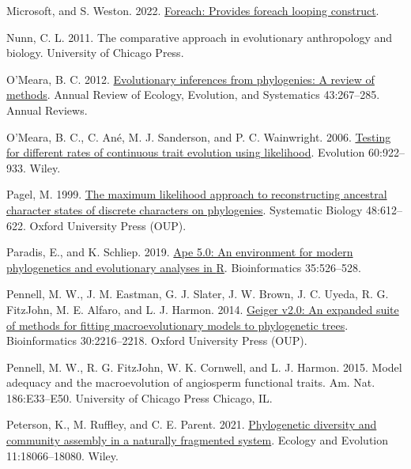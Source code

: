 \documentclass[fleqn,10pt,lineno]{wlpeerj} %
\newlength{\cslhangindent}
\newenvironment{CSLReferences}[2] %
 {\begin{list}{}{%
  \setlength{\itemindent}{0pt}
  \setlength{\leftmargin}{0pt}
  \setlength{\parsep}{0pt}
  \ifodd #1
   \setlength{\leftmargin}{\cslhangindent}
   \setlength{\itemindent}{-1\cslhangindent}
  \fi
  \setlength{\itemsep}{#2\baselineskip}}}
 {\end{list}}
\begin{document}
\begin{CSLReferences}{1}{0}
Microsoft, and S. Weston. 2022. \href{https://CRAN.R-project.org/package=foreach}{Foreach: Provides foreach looping construct}.

Nunn, C. L. 2011. The comparative approach in evolutionary anthropology and biology. University of Chicago Press.

O'Meara, B. C. 2012. \href{https://doi.org/10.1146/annurev-ecolsys-110411-160331}{Evolutionary inferences from phylogenies: A review of methods}. Annual Review of Ecology, Evolution, and Systematics 43:267--285. Annual Reviews.

O'Meara, B. C., C. Ané, M. J. Sanderson, and P. C. Wainwright. 2006. \href{https://doi.org/10.1111/j.0014-3820.2006.tb01171.x}{Testing for different rates of continuous trait evolution using likelihood}. Evolution 60:922--933. Wiley.

Pagel, M. 1999. \href{https://doi.org/10.1080/106351599260184}{The maximum likelihood approach to reconstructing ancestral character states of discrete characters on phylogenies}. Systematic Biology 48:612--622. Oxford University Press (OUP).

Paradis, E., and K. Schliep. 2019. \href{https://doi.org/10.1093/bioinformatics/bty633}{Ape 5.0: An environment for modern phylogenetics and evolutionary analyses in {R}}. Bioinformatics 35:526--528.

Pennell, M. W., J. M. Eastman, G. J. Slater, J. W. Brown, J. C. Uyeda, R. G. FitzJohn, M. E. Alfaro, and L. J. Harmon. 2014. \href{https://doi.org/10.1093/bioinformatics/btu181}{Geiger v2.0: An expanded suite of methods for fitting macroevolutionary models to phylogenetic trees}. Bioinformatics 30:2216--2218. Oxford University Press (OUP).

Pennell, M. W., R. G. FitzJohn, W. K. Cornwell, and L. J. Harmon. 2015. Model adequacy and the macroevolution of angiosperm functional traits. Am. Nat. 186:E33--E50. University of Chicago Press Chicago, IL.

Peterson, K., M. Ruffley, and C. E. Parent. 2021. \href{https://doi.org/10.1002/ece3.8404}{Phylogenetic diversity and community assembly in a naturally fragmented system}. Ecology and Evolution 11:18066--18080. Wiley.


\end{CSLReferences}
\end{document}
